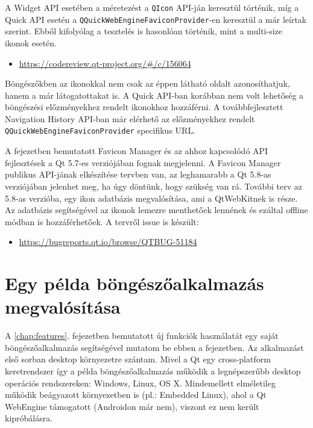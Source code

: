 \documentclass[12pt]{report}
\let\origurl\url
\renewcommand{\url}[1]{%
    \textcolor{blue}{\origurl{#1}}
}
\newcommand{\gerrit}[1]{%
    \textcolor{qtgreen}{\origurl{https://codereview.qt-project.org/\#/c/#1}}
}
\newcommand{\qtbug}[1]{%
    \textcolor{qtred}{\origurl{https://bugreports.qt.io/browse/QTBUG-#1}}
}
\begin{document}
A Widget API esetében a méretezést a \texttt{QIcon} API-ján keresztül történik, míg a
Quick API esetén a \texttt{QQuickWebEngineFaviconProvider}-en keresztül a már leírtak
szerint. Ebből kifolyólag a tesztelés is hasonlóan történik, mint a multi-size ikonok
esetén.

\begin{center}
    \begin{reviewbox}
        \begin{itemize}
            \renewcommand{\labelitemi}{\textcolor{qtgreen}{$\blacktriangleright$}}
            \item \gerrit{156064}
        \end{itemize}
    \end{reviewbox}
\end{center}

Böngészőkben az ikonokkal nem csak az éppen látható oldalt azonosíthatjuk, hanem a már
látogatottakat is. A Quick API-ban korábban nem volt lehetőség a böngészési előzményekhez
rendelt ikonokhoz hozzáférni. A továbbfejlesztett Navigation History API-ban már elérhető
az előzményekhez rendelt \texttt{QQuickWebEngineFaviconProvider} specifikus URL.

A fejezetben bemutatott Favicon Manager és az ahhoz kapcsolódó API fejlesztések a Qt 5.7-es
verziójában fognak megjelenni. A Favicon Manager publikus API-jának elkészítése tervben van,
az leghamarabb a Qt 5.8-as verziójában jelenhet meg, ha úgy döntünk, hogy szükség van rá.
További terv az 5.8-as verzióba, egy ikon adatbázis megvalósítása, ami a QtWebKitnek is
része. Az adatbázis segítségével az ikonok lemezre menthetőek lennének és ezáltal offline
módban is hozzáférhetőek. A tervről issue is készült:
\begin{center}
    \begin{issuebox}
        \begin{itemize}
            \renewcommand{\labelitemi}{\textcolor{qtred}{$\blacktriangleright$}}
            \item \qtbug{51184}
        \end{itemize}
    \end{issuebox}
\end{center}


\chapter{Egy példa böngészőalkalmazás megvalósítása}

A \ref{chap:features}. fejezetben bemutatott új funkciók használatát egy saját
böngészőalkalmazás segítségével mutatom be ebben a fejezetben. Az alkalmazást első sorban
desktop környezetre szántam. Mivel a Qt egy cross-platform keretrendszer így a példa
böngészőalkalmazás működik a legnépszerűbb desktop operációs rendszereken: Windows, Linux,
OS X. Mindemellett elméletileg működik beágyazott környezetben is (pl.: Embedded Linux),
ahol a Qt WebEngine támogatott (Androidon már nem), viszont ez nem került kipróbálásra.
\end{document}
